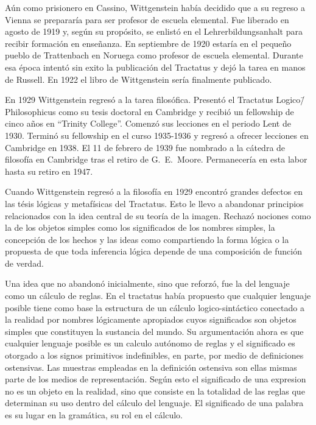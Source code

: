 
Aún como prisionero en Cassino, Wittgenstein había decidido que a su regreso a
Vienna se prepararía para ser profesor de escuela
elemental\autocite[cf.~][p.~158]{monk}. Fue liberado en agosto de 1919 y, según
su propósito, se enlistó en el Lehrerbildungsanhalt para recibir formación en
enseñanza. En septiembre de 1920 estaría en el pequeño pueblo de Trattenbach en
Noruega como profesor de escuela elemental. Durante esa época intentó sin exito
la publicación del Tractatus y dejó la tarea en manos de Russell. En 1922 el
libro de Wittgenstein sería finalmente publicado.

En 1929 Wittgenstein regresó a la tarea filosófica. Presentó el Tractatus
Logico\=/Philosophicus como su tesis doctoral en Cambridge y recibió un
fellowship de cinco años en ``Trinity College''. Comenzó sus lecciones en el
periodo Lent de 1930. Terminó su fellowship en el curso 1935-1936 y regresó a
ofrecer lecciones en Cambridge en 1938. El 11 de febrero de 1939 fue nombrado a
la cátedra de filosofía en Cambridge tras el retiro de G.~E.~Moore. Permanecería
en esta labor hasta su retiro en 1947.

Cuando Wittgenstein regresó a la filosofía en 1929 encontró grandes defectos
en las tésis lógicas y metafísicas del Tractatus. Esto le llevo a abandonar
principios relacionados con la idea central de su teoría de la imagen. Rechazó
nociones como la de los objetos simples como los significados de los nombres
simples, la concepción de los hechos y las ideas como compartiendo la forma
lógica o la propuesta de que toda inferencia lógica depende de una composición
de función de verdad.\autocite[cf.~][p.~44]{rulesngrammar}

Una idea que no abandonó inicialmente, sino que reforzó, fue la del lenguaje
como un cálculo de reglas. En el tractatus había propuesto que cualquier
lenguaje posible tiene como base la estructura de un cálculo logico-sintáctico
conectado a la realidad por nombres lógicamente apropiados cuyos significados
son objetos simples que constituyen la sustancia del mundo. Su argumentación
ahora es que cualquier lenguaje posible es un calculo autónomo de reglas y el
significado es otorgado a los signos primitivos indefinibles, en parte, por
medio de definiciones ostensivas. Las muestras empleadas en la definición
ostensiva son ellas mismas parte de los medios de representación. Según esto el
significado de una expresion no es un objeto en la realidad, sino que consiste
en la totalidad de las reglas que determinan su uso dentro del cálculo del
lenguaje. El significado de una palabra es su lugar en la gramática, su rol en
el cálculo.\autocite[cf.~][p.44]{rulesngrammar}

